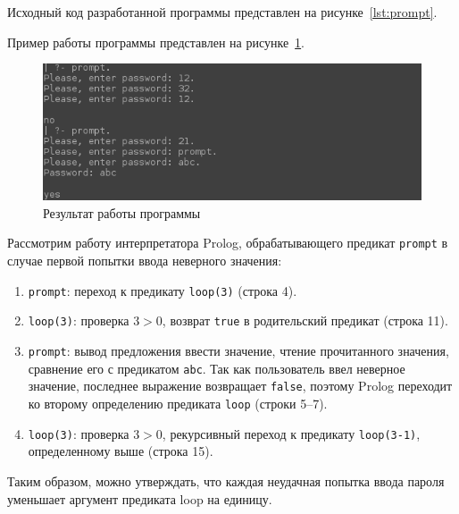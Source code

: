Исходный код разработанной программы представлен на
рисунке~\ref{lst:prompt}.



Пример работы программы представлен на рисунке~\ref{fig:prompt}.

\begin{figure}[h!]
  \centering
  \includegraphics[width=150mm]{img/prompt}
  \caption{Результат работы программы}
  \label{fig:prompt}
\end{figure}



Рассмотрим работу интерпретатора Prolog, обрабатывающего предикат \texttt{prompt} 
в случае первой попытки ввода неверного значения:

\begin{enumerate}
\item \texttt{prompt}:
  переход к предикату \texttt{loop(3)} (строка 4). 
\item \texttt{loop(3)}:
  проверка \( 3 > 0 \), возврат \texttt{true} в родительский предикат (строка 11). 
\item \texttt{prompt}:
  вывод предложения ввести значение, чтение прочитанного значения,
  сравнение его с предикатом \texttt{abc}. 
  Так как пользователь ввел неверное значение, последнее выражение возвращает
  \texttt{false}, поэтому Prolog переходит ко второму определению
  предиката \texttt{loop} (строки 5--7).
\item \texttt{loop(3)}:
  проверка \( 3 > 0 \),
  рекурсивный переход к предикату \texttt{loop(3-1)},
  определенному выше (строка 15).
\end{enumerate}

Таким образом, можно утверждать, что каждая неудачная попытка ввода пароля уменьшает
аргумент предиката loop на единицу.


